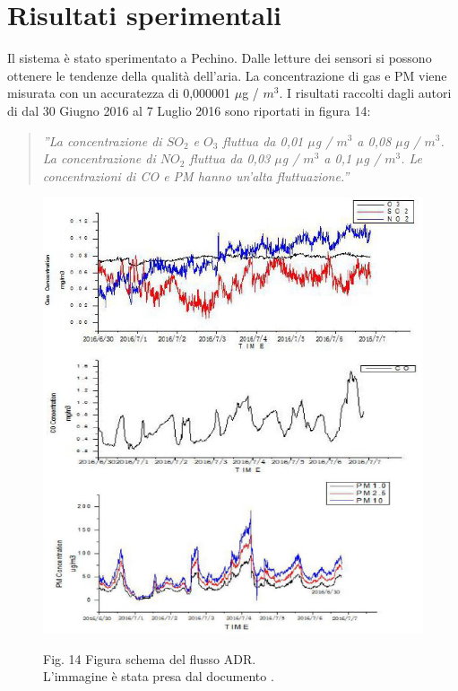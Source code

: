\documentclass[a4paper]{report} %
\begin{document}
\section{Risultati sperimentali}
Il sistema è stato sperimentato a Pechino. Dalle letture dei sensori si possono ottenere le tendenze della qualità dell'aria. La concentrazione di gas e PM viene misurata con un accuratezza di 0,000001 $\mu$g / $ m^3 $. I risultati raccolti dagli autori di \cite{art:rif.40} dal 30 Giugno 2016 al 7 Luglio 2016 sono riportati in figura 14:
\begin{quote}
	\textit{''La concentrazione di $ SO_{2} $ e $ O_{3} $ fluttua da 0,01 $\mu$g / $ m^3 $ a 0,08 $\mu$g / $m^3$. La concentrazione di $ NO_{2} $ fluttua da 0,03 $\mu$g / $m^3$ a 0,1 $\mu$g / $m^3$. Le concentrazioni di CO e PM hanno un'alta fluttuazione.''}
\end{quote}  
\begin{figure}
	\centering
	\includegraphics[scale=.5]{Immagini/risAria.png}
	
	Fig. 14 Figura schema del flusso ADR.\\
	L'immagine è stata presa dal documento \cite{art:rif.40}.\\
\end{figure}
\end{document}
